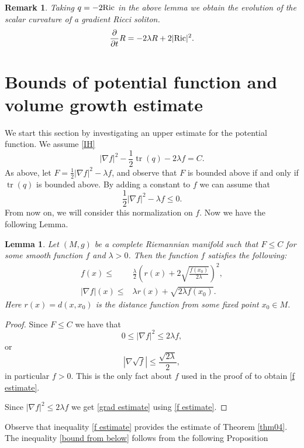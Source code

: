 \documentclass{amsart}
\theoremstyle{plain}
\newtheorem{lemma}[theorem]{\bf Lemma}
\newtheorem{remark}[theorem]{Remark}
\numberwithin{equation}{section}
\begin{document}
\begin{remark}
{\em 
 Taking $q=-2{\rm Ric}$ in the above lemma we obtain the evolution of the scalar curvature of a gradient Ricci soliton.
 $$\frac{\partial}{\partial t}R=-2\lambda R+2|{\rm Ric}|^2.$$}
\end{remark}


\section{Bounds of potential function and volume growth estimate}

We start this section by investigating  an upper estimate for the potential function. We assume \eqref{IH}
$$|\nabla f|^2 - \frac{1}{2}\operatorname{tr}(q)-2\lambda f=C.$$
As above, let  $F=\frac{1}{2}|\nabla f|^2-\lambda f$, and observe that $F$ is bounded above if and only if $\operatorname{tr}(q)$ is bounded above.  By adding a constant to $f$  we can assume that
$$\frac{1}{2}|\nabla f|^2-\lambda f\leq 0.$$
From now on,  we will consider this normalization on $f$. Now we have the following Lemma. 

\begin{lemma}\label{lema estimates}
Let $\left(M,g\right)$ be a complete Riemannian manifold such that 
$F\leq  C$ for some smooth function $f$ and $\lambda>0$.  Then the function $f$ satisfies the following:
\begin{align} \label{f estimate}
f(x)\leq & \frac{\lambda}{2}\left(r(x)+2\sqrt{\frac{f(x_0)}{2\lambda}}\right)^2, \\ \label{grad estimate}
|\nabla f|(x) \leq& \lambda r(x) + \sqrt{2\lambda f(x_0)}.
\end{align}
Here $r(x)=d(x,x_0)$ is the distance function from some fixed point $x_0 \in M$.
\end{lemma}
\begin{proof}
Since $F\leq C$ we have that
$$0\leq|\nabla f|^2\leq 2\lambda f,$$
or
$$|\nabla\sqrt{f}|\leq \frac{\sqrt{2\lambda}}{2},$$
in particular  $f>0$. This is the only fact about $f$ used in the proof of  \cite{Cao-Zhou} to  obtain \eqref{f estimate}. 

Since $|\nabla f|^2\leq 2\lambda f$ we get \eqref{grad estimate} using \eqref{f estimate}. 
\end{proof}

Observe that inequality \eqref{f estimate} provides  the estimate of Theorem \ref{thm04}. The inequality \eqref{bound from below} follows from the following Proposition
\end{document}
